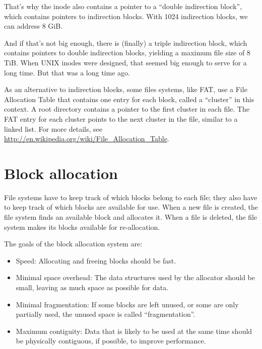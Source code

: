 \documentclass[12pt]{book}
\begin{document}
That's why the inode also contains a pointer to a ``double indirection
block'', which contains pointers to indirection blocks.  With
1024 indirection blocks, we can address 8 GiB.

And if that's not big enough, there is (finally) a triple indirection
block, which contains pointers to double indirection blocks, yielding
a maximum file size of 8 TiB.  When UNIX inodes were designed, that
seemed big enough to serve for a long time.  But that was a long time
ago.

As an alternative to indirection blocks, some files systems, like FAT,
use a File Allocation Table that contains one entry for each block,
called a ``cluster'' in this context.  A root directory contains a
pointer to the first cluster in each file.  The FAT entry for each
cluster points to the next cluster in the file, similar to a linked
list.  For more details, see
\url{http://en.wikipedia.org/wiki/File_Allocation_Table}.


\section{Block allocation}

File systems have to keep track of which blocks belong to each file;
they also have to keep track of which blocks are available for use.
When a new file is created, the file system finds an available
block and allocates it.  When a file is deleted, the file system
makes its blocks available for re-allocation.

The goals of the block allocation system are:

\begin{itemize}

\item Speed: Allocating and freeing blocks should be fast.

\item Minimal space overhead: The data structures used by the allocator
  should be small, leaving as much space as possible for data.

\item Minimal fragmentation: If some blocks are left unused, or some
  are only partially used, the unused space is called
  ``fragmentation''.

\item Maximum contiguity: Data that is likely to be used at the same
  time should be physically contiguous, if possible, to improve
  performance.

\end{itemize}
\end{document}
